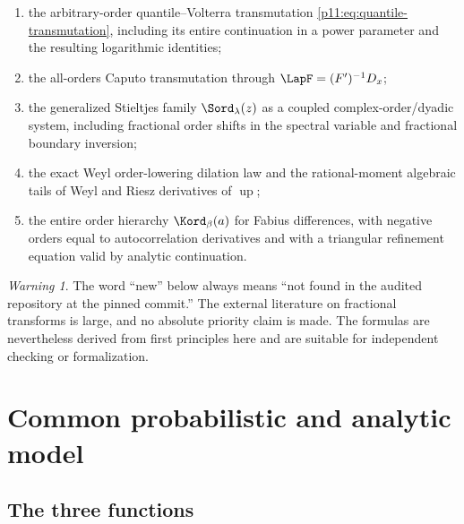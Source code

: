 \documentclass[11pt,oneside]{article}
\theoremstyle{definition}
\theoremstyle{remark}
\newtheorem{warning}[theorem]{Warning}
\newcommand{\Up}{\operatorname{up}}
\newcommand{\1}{\mathbf 1}
\begin{document}
\begin{enumerate}
\item the arbitrary-order quantile--Volterra transmutation
      \eqref{p11:eq:quantile-transmutation}, including its entire continuation in
      a power parameter and the resulting logarithmic identities;
\item the all-orders Caputo transmutation through
      $\LapF=(F')^{-1}D_x$;
\item the generalized Stieltjes family $\Sord_\lambda(z)$ as a coupled
      complex-order/dyadic system, including fractional order shifts in the
      spectral variable and fractional boundary inversion;
\item the exact Weyl order-lowering dilation law and the rational-moment
      algebraic tails of Weyl and Riesz derivatives of $\Up$;
\item the entire order hierarchy $\Kord_\beta(a)$ for Fabius differences,
      with negative orders equal to autocorrelation derivatives and with a
      triangular refinement equation valid by analytic continuation.
\end{enumerate}

\begin{warning}
The word ``new'' below always means ``not found in the audited repository at
the pinned commit.''  The external literature on fractional transforms is
large, and no absolute priority claim is made.  The formulas are nevertheless
derived from first principles here and are suitable for independent checking
or formalization.
\end{warning}

\section{Common probabilistic and analytic model}
\label{p11:sec:model}

\subsection{The three functions}
\end{document}
